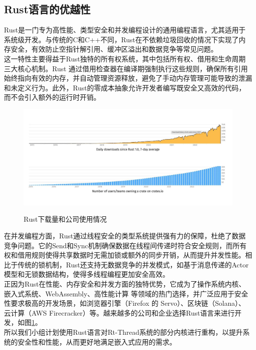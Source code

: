 \subsection{Rust语言的优越性}
\indent Rust是一门专为高性能、类型安全和并发编程设计的通用编程语言，尤其适用于系统级开发\cite{Wikipedia_2025}。与传统的C和C++不同，Rust在不依赖垃圾回收的情况下实现了内存安全，有效防止空指针解引用、缓冲区溢出和数据竞争等常见问题。\\
\indent 这一特性主要得益于Rust独特的所有权系统，其中包括所有权、借用和生命周期三大核心机制。Rust 通过借用检查器在编译期强制执行这些规则，确保所有引用始终指向有效的内存，并自动管理资源释放，避免了手动内存管理可能导致的泄漏和未定义行为。此外，Rust的零成本抽象允许开发者编写既安全又高效的代码，而不会引入额外的运行时开销。\\
\begin{figure}[htpb]
    \centering
    \caption{Rust下载量和公司使用情况}
    \includegraphics[width=1\linewidth]{img/lib-rs-stats-rust-downloads-users.jpg}
    \label{fig1}
\end{figure}

\indent 在并发编程方面，Rust通过线程安全的类型系统提供强有力的保障，杜绝了数据竞争问题。它的Send和Sync机制确保数据在线程间传递时符合安全规则，而所有权和借用规则使得共享数据时无需加锁或额外的同步开销，从而提升并发性能。相比于传统的锁机制，Rust还支持无数据竞争的并发模式，如基于消息传递的Actor模型和无锁数据结构，使得多线程编程更加安全高效。\\
\indent 正因为Rust在性能、内存安全和并发方面的独特优势，它成为了操作系统内核、嵌入式系统、WebAssembly、高性能计算 等领域的热门选择\cite{sharma2023rust}\cite{sharma2024rust}，并广泛应用于安全性要求极高的开发场景，如浏览器引擎（Firefox 的 Servo）、区块链（Solana）、云计算（AWS Firecracker）\cite{Zhang}等。越来越多的公司和企业选择Rust语言来进行开发\cite{Lib.rs}，如图\ref{fig1}。\\
\indent 所以我们小组计划使用Rust语言对Rt-Thread系统的部分内核进行重构，以提升系统的安全性和性能，从而更好地满足嵌入式应用的需求。\\

